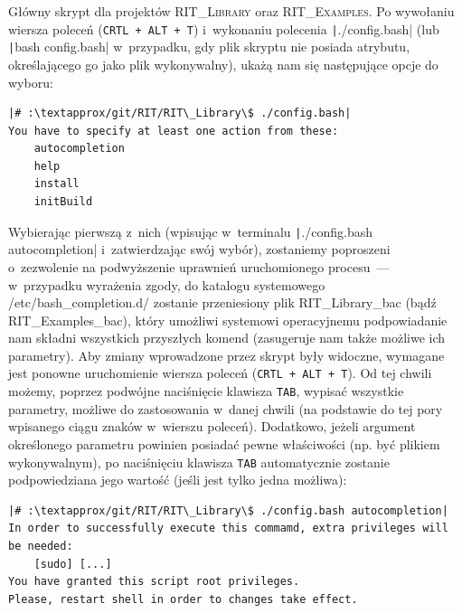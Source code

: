 
Główny skrypt dla projektów \textsc{RIT\_Library} oraz \textsc{RIT\_Examples}.
Po wywołaniu wiersza poleceń (\texttt{CRTL + ALT + T}) i~wykonaniu polecenia \texttt|./config.bash| (lub \texttt|bash config.bash| w~przypadku, gdy plik skryptu nie posiada atrybutu, określającego go jako plik wykonywalny), ukażą nam się następujące opcje do wyboru:

\begin{verbatim}
|# :\textapprox/git/RIT/RIT\_Library\$ ./config.bash|
You have to specify at least one action from these:
	autocompletion
	help
	install
	initBuild
\end{verbatim}

Wybierając pierwszą z~nich (wpisując w~terminalu \texttt|./config.bash autocompletion| i~zatwierdzając swój wybór), zostaniemy poproszeni o~zezwolenie na podwyższenie uprawnień uruchomionego procesu~--- w~przypadku wyrażenia zgody, do katalogu systemowego \textsf{/etc/bash\_completion.d/} zostanie przeniesiony plik \textsf{RIT\_Library\_bac} (bądź \textsf{RIT\_Examples\_bac}), który umożliwi systemowi operacyjnemu podpowiadanie nam składni wszystkich przyszłych komend (zasugeruje nam także możliwe ich parametry).
Aby zmiany wprowadzone przez skrypt były widoczne, wymagane jest ponowne uruchomienie wiersza poleceń (\texttt{CRTL + ALT + T}).
Od tej chwili możemy, poprzez podwójne naciśnięcie klawisza \texttt{TAB}, wypisać wszystkie parametry, możliwe do zastosowania w~danej chwili (na podstawie do tej pory wpisanego ciągu znaków w~wierszu poleceń).
Dodatkowo, jeżeli argument określonego parametru powinien posiadać pewne właściwości (np. być plikiem wykonywalnym), po naciśnięciu klawisza \texttt{TAB} automatycznie zostanie podpowiedziana jego wartość (jeśli jest tylko jedna możliwa):

\begin{verbatim}
|# :\textapprox/git/RIT/RIT\_Library\$ ./config.bash autocompletion|
In order to successfully execute this commamd, extra privileges will be needed:
	[sudo] [...]
You have granted this script root privileges.
Please, restart shell in order to changes take effect.
\end{verbatim}

